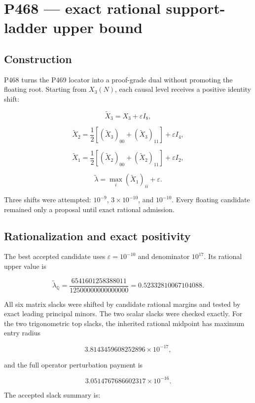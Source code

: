 \documentclass[11pt,a4paper,openany]{report}
\begin{document}
\chapter{P468 --- exact rational support-ladder upper bound}

\section{Construction}

P468 turns the P469 locator into a proof-grade dual without promoting the floating root. Starting from \(X_3(N)\), each causal level receives a positive identity shift:

\[
\widetilde X_3=X_3+\varepsilon I_8,
\]

\[
\widetilde X_2=\frac12
\left[(\widetilde X_3)_{00}+(\widetilde X_3)_{11}\right]
+\varepsilon I_4,
\]

\[
\widetilde X_1=\frac12
\left[(\widetilde X_2)_{00}+(\widetilde X_2)_{11}\right]
+\varepsilon I_2,
\]

\[
\widetilde\lambda=
\max_i(\widetilde X_1)_{ii}+\varepsilon.
\]

Three shifts were attempted: \(10^{-9}\), \(3\times10^{-10}\), and \(10^{-10}\). Every floating candidate remained only a proposal until exact rational admission.

\section{Rationalization and exact positivity}

The best accepted candidate uses \(\varepsilon=10^{-10}\) and denominator \(10^{17}\). Its rational upper value is

\[
\widetilde\lambda_{\mathbb Q}
=\frac{6541601258388011}{12500000000000000}
=0.52332810067104088.
\]

All six matrix slacks were shifted by candidate rational margins and tested by exact leading principal minors. The two scalar slacks were checked exactly. For the two trigonometric top slacks, the inherited rational midpoint has maximum entry radius

\[
3.8143459608252896\times10^{-17},
\]

and the full operator perturbation payment is

\[
3.0514767686602317\times10^{-16}.
\]

The accepted slack summary is:
\end{document}
